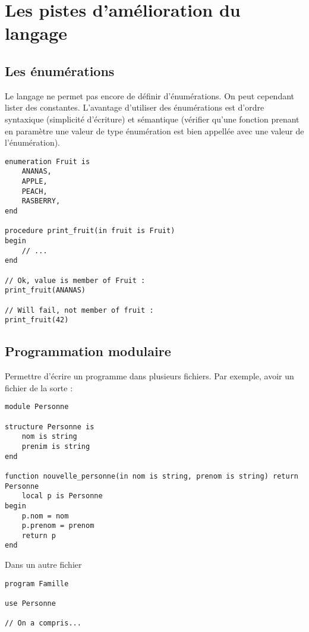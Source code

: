 \section{Les pistes d'amélioration du langage}

\subsection{Les énumérations}

Le langage ne permet pas encore de définir d'énumérations. On peut cependant
lister des constantes.
L'avantage d'utiliser des énumérations est d'ordre syntaxique (simplicité
d'écriture) et sémantique (vérifier qu'une fonction prenant en paramètre une
valeur de type énumération est bien appellée avec une valeur de l'énumération).

\begin{verbatim}
enumeration Fruit is
    ANANAS,
    APPLE,
    PEACH,
    RASBERRY,
end

procedure print_fruit(in fruit is Fruit)
begin
    // ...
end

// Ok, value is member of Fruit :
print_fruit(ANANAS)

// Will fail, not member of fruit :
print_fruit(42)

\end{verbatim}


\subsection{Programmation modulaire}

Permettre d'écrire un programme dans plusieurs fichiers.
Par exemple, avoir un fichier de la sorte :

\begin{verbatim}
module Personne

structure Personne is
    nom is string
    prenim is string
end

function nouvelle_personne(in nom is string, prenom is string) return Personne
    local p is Personne
begin
    p.nom = nom
    p.prenom = prenom
    return p
end
\end{verbatim}

Dans un autre fichier

\begin{verbatim}
program Famille

use Personne

// On a compris...
\end{verbatim}

